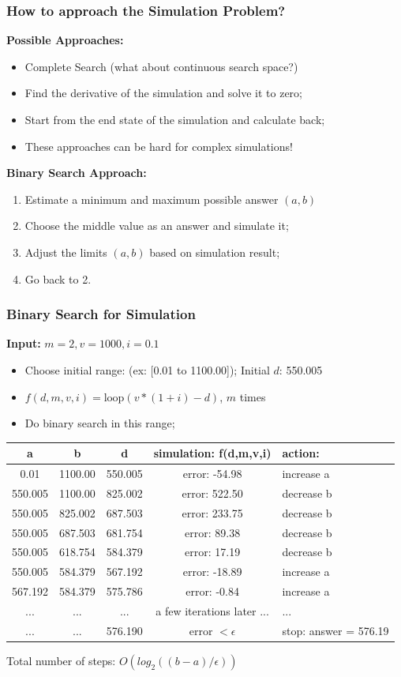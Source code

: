\begin{frame}
  \frametitle{How to approach the Simulation Problem?}

  {\bf Possible Approaches:}
  \begin{itemize}
  \item Complete Search (what about continuous search space?)
  \item Find the derivative of the simulation and solve it to zero;
  \item Start from the end state of the simulation and calculate back;
  \item \alert{These approaches can be hard for complex simulations!}
  \end{itemize}

  \bigskip

  {\bf Binary Search Approach:}
  \begin{enumerate}
  \item Estimate a minimum and maximum possible answer $(a,b)$
  \item Choose the middle value as an answer and simulate it;
  \item Adjust the limits $(a,b)$ based on simulation result;
  \item Go back to 2.
\end{enumerate}
\end{frame}

\begin{frame}
  \frametitle{Binary Search for Simulation}
{\bf Input:} $m = 2, v = 1000, i = 0.1$\bigskip

\begin{itemize}
  \item Choose initial range: (ex: [0.01 to 1100.00]); Initial $d$: 550.005
  \item $f(d,m,v,i) = \text{loop}(v*(1+i) - d)$, $m$ times
  \item Do binary search in this range;
\end{itemize}
\bigskip

{\smaller
\begin{tabular}{c|c|c|c|l}
 a & b & d & simulation: f(d,m,v,i) & action: \\
 \hline
 0.01 & 1100.00 & 550.005 & error: -54.98 & increase a\\
 550.005 & 1100.00 & 825.002 & error: 522.50 & decrease b\\
 550.005 & 825.002 & 687.503 & error: 233.75 & decrease b\\
 550.005 & 687.503 & 681.754 & error: 89.38 & decrease b\\
 550.005 & 618.754 & 584.379 & error: 17.19 & decrease b\\
 550.005 & 584.379 & 567.192 & error: -18.89 & increase a\\
 567.192 & 584.379 & 575.786 & error: -0.84 & increase a\\
 ... & ... & ... & a few iterations later ... & ...\\
 ... & ... & 576.190 & error $< \epsilon$ & stop: answer = 576.19\\
\end{tabular}}
\bigskip

Total number of steps: $O(log_2((b-a)/\epsilon))$
\end{frame}

